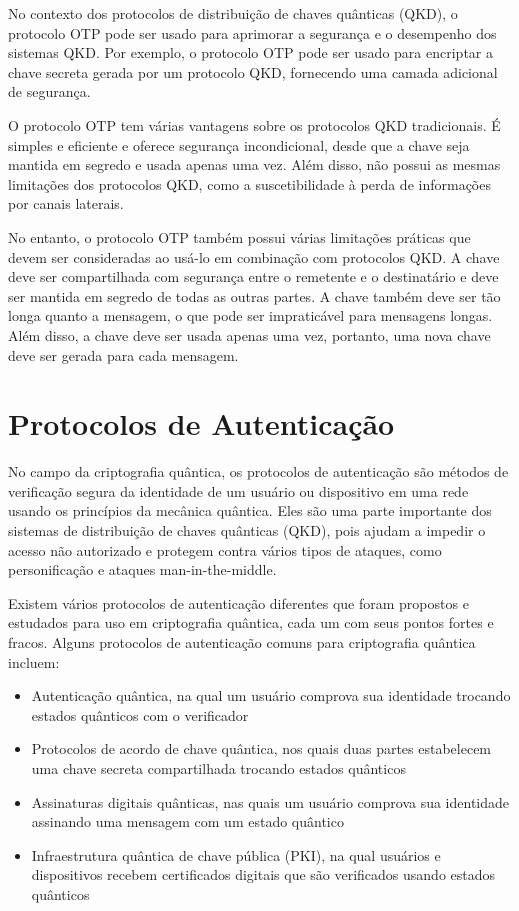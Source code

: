 No contexto dos protocolos de distribuição de chaves quânticas (QKD), o protocolo OTP pode ser usado para aprimorar a segurança e o desempenho dos sistemas QKD. Por exemplo, o protocolo OTP pode ser usado para encriptar a chave secreta gerada por um protocolo QKD, fornecendo uma camada adicional de segurança.

O protocolo OTP tem várias vantagens sobre os protocolos QKD tradicionais. É simples e eficiente e oferece segurança incondicional, desde que a chave seja mantida em segredo e usada apenas uma vez. Além disso, não possui as mesmas limitações dos protocolos QKD, como a suscetibilidade à perda de informações por canais laterais.

No entanto, o protocolo OTP também possui várias limitações práticas que devem ser consideradas ao usá-lo em combinação com protocolos QKD. A chave deve ser compartilhada com segurança entre o remetente e o destinatário e deve ser mantida em segredo de todas as outras partes. A chave também deve ser tão longa quanto a mensagem, o que pode ser impraticável para mensagens longas. Além disso, a chave deve ser usada apenas uma vez, portanto, uma nova chave deve ser gerada para cada mensagem.

\section{Protocolos de Autenticação}

No campo da criptografia quântica, os protocolos de autenticação são métodos de verificação segura da identidade de um usuário ou dispositivo em uma rede usando os princípios da mecânica quântica. Eles são uma parte importante dos sistemas de distribuição de chaves quânticas (QKD), pois ajudam a impedir o acesso não autorizado e protegem contra vários tipos de ataques, como personificação e ataques man-in-the-middle.

Existem vários protocolos de autenticação diferentes que foram propostos e estudados para uso em criptografia quântica, cada um com seus pontos fortes e fracos. Alguns protocolos de autenticação comuns para criptografia quântica incluem:

\begin{itemize}
  \item Autenticação quântica, na qual um usuário comprova sua identidade trocando estados quânticos com o verificador
  \item Protocolos de acordo de chave quântica, nos quais duas partes estabelecem uma chave secreta compartilhada trocando estados quânticos
  \item Assinaturas digitais quânticas, nas quais um usuário comprova sua identidade assinando uma mensagem com um estado quântico
  \item Infraestrutura quântica de chave pública (PKI), na qual usuários e dispositivos recebem certificados digitais que são verificados usando estados quânticos
\end{itemize}

